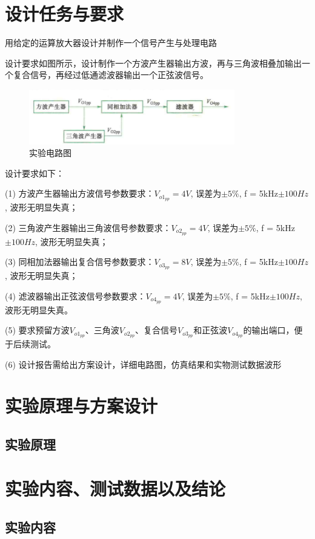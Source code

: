 \documentclass[12pt, a4paper]{article} %
\begin{document}
\section{设计任务与要求}

用给定的运算放大器设计并制作一个信号产生与处理电路

设计要求如图所示，设计制作一个方波产生器输出方波，再与三角波相叠加输出一个复合信号，再经过低通滤波器输出一个正弦波信号。

\begin{figure}[th]
    \centering
    \includegraphics[width=0.8\textwidth]{image/1.png}
    \caption{实验电路图}
    \label{fig:实验电路图}
\end{figure}

设计要求如下：

(1) 方波产生器输出方波信号参数要求：$ V_{o1_{pp}} = 4V$, 误差为$ \pm 5\% $, f = 5kHz$\pm 100Hz$, 波形无明显失真；

(2) 三角波产生器输出三角波信号参数要求：$ V_{o2_{pp}} = 4V$, 误差为$ \pm 5\% $, f = 5kHz$\pm 100Hz$, 波形无明显失真；

(3) 同相加法器输出复合信号参数要求：$ V_{o3_{pp}} = 8V$, 误差为$ \pm 5\% $, f = 5kHz$\pm 100Hz$, 波形无明显失真；

(4) 滤波器输出正弦波信号参数要求：$ V_{o4_{pp}} = 4V$, 误差为$ \pm 5\% $, f = 5kHz$\pm 100Hz$, 波形无明显失真。

(5) 要求预留方波$V_{o1_{pp}}$、三角波$V_{o2_{pp}}$、复合信号$V_{o3_{pp}}$和正弦波$V_{o4_{pp}}$的输出端口，便于后续测试。

(6) 设计报告需给出方案设计，详细电路图，仿真结果和实物测试数据波形
\section{实验原理与方案设计}
\subsection{实验原理}
\section{实验内容、测试数据以及结论}

\subsection{实验内容}
\end{document}

